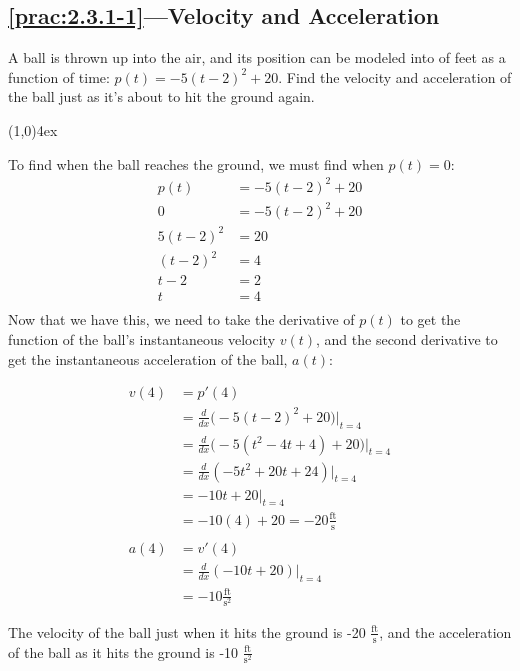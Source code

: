 \documentclass{MathNotes}
\newcommand{\br}{
	\begin{center}
		\line(1,0){4ex}
	\end{center}}
\begin{document}
\newpage
\subsection*{\ref{prac:2.3.1-1}---Velocity and Acceleration}\label{ans:2.3.1-1}
A ball is thrown up into the air, and its position can be modeled into
of feet as a function of time: $p(t)=-5(t-2)^2+20$. Find the velocity and
acceleration of the ball just as it's about to hit the ground again.
\br
To find when the ball reaches the ground, we must find when $p(t)=0$:
\begin{align*}
	p(t)     & =-5(t-2)^2+20 \\
	0        & =-5(t-2)^2+20 \\
	5(t-2)^2 & =20           \\
	(t-2)^2  & =4            \\
	t-2      & =2            \\
	t        & =4            \\
\end{align*}
Now that we have this, we need to take the derivative of $p(t)$ to get the
function of the ball's instantaneous velocity $v(t)$, and the second derivative
to get the instantaneous acceleration of the ball, $a(t)$:

\begin{align*}
	v(4) & =p'(4)                                            \\
	     & =\frac{d}{dx}\big(-5(t-2)^2+20\big)\Big|_{t=4}    \\
	     & =\frac{d}{dx}\big(-5(t^2-4t+4)+20\big)\Big|_{t=4} \\
	     & =\frac{d}{dx}(-5t^2+20t+24)\Big|_{t=4}            \\
	     & =-10t+20\Big|_{t=4}                               \\
	     & =-10(4)+20=-20\frac{\text{ft}}{\text{s}}          \\
	\\
	a(4) & =v'(4)                                            \\
	     & =\frac{d}{dx}(-10t+20)\Big|_{t=4}                 \\
	     & =-10\frac{\text{ft}}{\text{s}^2}
\end{align*}

The velocity of the ball just when it hits the ground is -20
$\displaystyle\frac{\text{ft}}{\text{s}}$, and the acceleration of the ball as
it hits the ground is -10 $\frac{\text{ft}}{\text{s}^2}$

\newpage
\end{document}
